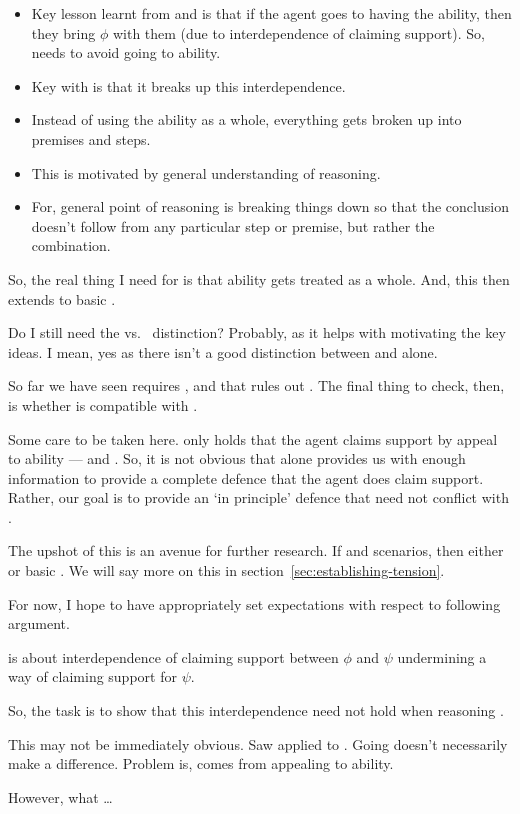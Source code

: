 {
  \color{red}
  \begin{itemize}
  \item Key lesson learnt from \nI{} and \nr{} is that if the agent goes to having the ability, then they bring \(\phi\) with them (due to interdependence of claiming support).
    So, \ur{} needs to avoid going to ability.
  \item Key with \ur{} is that it breaks up this interdependence.
  \item Instead of using the ability as a whole, everything gets broken up into premises and steps.
  \item This is motivated by general understanding of reasoning.
  \item For, general point of reasoning is breaking things down so that the conclusion doesn't follow from any particular step or premise, but rather the combination.
  \end{itemize}

  So, the real thing I need for \nr{} is that ability gets treated as a whole.
  And, this then extends to basic \AR{}.

  Do I still need the \ur{} vs.\ \nr{} distinction?
  Probably, as it helps with motivating the key ideas.
  I mean, yes as there isn't a good distinction between \AR{} and \WR{} alone.
}

\begin{note}
  So far we have seen \ESU{} requires \nr{}, and that \nI{} rules out \nr{}.
  The final thing to check, then, is whether \ur{} is compatible with \nI{}.

  Some care to be taken here.
  \ur{} only holds that the agent claims support by appeal to ability --- \AR{} and \WR{}.
  So, it is not obvious that \ur{} alone provides us with enough information to provide a complete defence that the agent does claim support.
  Rather, our goal is to provide an `in principle' defence that \ur{} need not conflict with \nI{}.

  The upshot of this is an avenue for further research.
  If \nI{} and scenarios, then either \ur{} or basic \AR{}.
  We will say more on this in section~\ref{sec:establishing-tension}.

  For now, I hope to have appropriately set expectations with respect to following argument.
\end{note}

\begin{note}
  \nI{} is about interdependence of claiming support between \(\phi\) and \(\psi\) undermining a way of claiming support for \(\psi\).

  So, the task is to show that this interdependence need not hold when reasoning \ur{}.

  This may not be immediately obvious.
  Saw \nI{} applied to \nr{}.
  Going \ur{} doesn't necessarily make a difference.
  {
    \color{red}
    Problem is, comes from appealing to ability.
  }

  However, what \ur{} \dots
\end{note}

